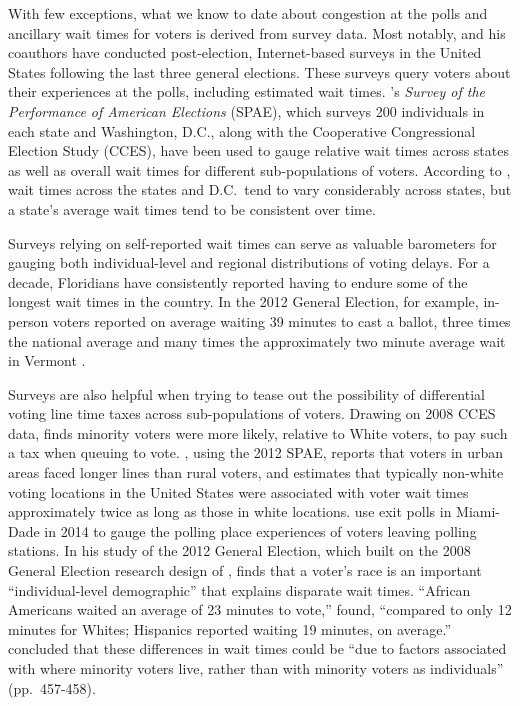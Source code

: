 \documentclass[12pt,titlepage]{article}
\begin{document}

With few exceptions, what we know to date about congestion at the
polls and ancillary wait times for voters is derived from survey
data. Most notably, \citet{stewart:waitingtovote2012} and his
coauthors have conducted post-election, Internet-based surveys in the
United States following the last three general elections.  These
surveys query voters about their experiences at the polls, including
estimated wait times.  \citeauthor{stewart:waitingtovote2012}'s
\emph{Survey of the Performance of American Elections} (SPAE), which
surveys 200 individuals in each state and Washington, D.C., along with
the Cooperative Congressional Election Study (CCES), have been used to
gauge relative wait times across states as well as overall wait times
for different sub-populations of voters.  According to
\citeauthor{stewart:waitingtovote2012}, wait times across the states
and D.C.\ tend to vary considerably across states, but a state's
average wait times tend to be consistent over time.

Surveys relying on self-reported wait times can serve as valuable
barometers for gauging both individual-level and regional
distributions of voting delays.  For a decade, Floridians have
consistently reported having to endure some of the longest wait times
in the country. In the 2012 General Election, for example, in-person
voters reported on average waiting 39 minutes to cast a ballot, three
times the national average and many times the approximately two minute
average wait in Vermont \citep{stewart:waitingtovote2012}.

Surveys are also helpful when trying to tease out the possibility of
differential voting line time taxes across sub-populations of voters.
Drawing on 2008 CCES data, \cite{mukherjee:timetax} finds minority
voters were more likely, relative to White voters, to pay such a tax
when queuing to vote. \citet{kimball:voting}, using the 2012 SPAE,
reports that voters in urban areas faced longer lines than rural
voters, and \citet{pettigrew:racegapwaittimes} estimates that
typically non-white voting locations in the United States were
associated with voter wait times approximately twice as long as those
in white locations.  \cite{herron:confidence} use exit polls in
Miami-Dade in 2014 to gauge the polling place experiences of voters
leaving polling stations.  In his study of the 2012 General Election,
which built on the 2008 General Election research design of
\citet{alvarez:survey}, \cite{stewart:waitingtovote2012} finds that a
voter's race is an important ``individual-level demographic'' that
explains disparate wait times.  ``African Americans waited an average
of 23 minutes to vote,'' \citeauthor{stewart:waitingtovote2012} found,
``compared to only 12 minutes for Whites; Hispanics reported waiting
19 minutes, on average.''  \citeauthor{stewart:waitingtovote2012}
concluded that these differences in wait times could be ``due to
factors associated with where minority voters live, rather than with
minority voters as individuals'' (pp.\ 457-458).
\end{document}
